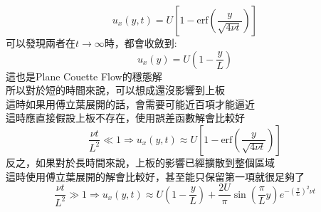 \documentclass[../main.tex]{subfiles}
\begin{document}
\begin{itemize}
\begin{enumerate}
      \begin{equation}
        u_x(y,t) = U \left[
          1 - \text{erf}\left(
            \frac{y}{\sqrt{4\nu t}}
          \right)
        \right]
      \end{equation}
      可以發現兩者在$t\to\infty$時，都會收斂到:
      \begin{equation}
        u_x(y) = U \left(
          1 - \frac{y}{L}
        \right)
      \end{equation}
      這也是Plane Couette Flow的穩態解\\
      所以對於短的時間來說，可以想成還沒影響到上板\\
      這時如果用傅立葉展開的話，會需要可能近百項才能逼近\\
      這時應直接假設上板不存在，使用誤差函數解會比較好
      \begin{equation}
        \frac{\nu t}{L^2} \ll 1 \Rightarrow  u_x(y,t) \approx U \left[
          1 - \text{erf}\left(
            \frac{y}{\sqrt{4\nu t}}
          \right)
        \right]
      \end{equation}
      反之，如果對於長時間來說，上板的影響已經擴散到整個區域\\
      這時使用傅立葉展開的解會比較好，甚至能只保留第一項就很足夠了
      \begin{equation}
        \frac{\nu t}{L^2} \gg 1 \Rightarrow  u_x(y,t) \approx U \left(
          1 - \frac{y}{L}
        \right) + \frac{2U}{\pi} \sin\left(
          \frac{\pi}{L} y
        \right) e^{-\left(
          \frac{\pi}{L}
        \right)^2 \nu t}
      \end{equation}
  \end{enumerate}
\end{itemize}
\end{document}
